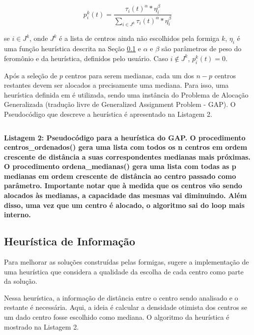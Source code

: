 \documentclass[12pt]{article}
\begin{document}
\begin{displaymath}
 p_i^k(t) = \frac{\tau_i(t)^\alpha * \eta_i ^ \beta}{\sum_{i \in J^k}^{} \tau_i(t)^\alpha * \eta_i^\beta}
\end{displaymath}

se $ i \in J^k $, onde $ J^k $ é a lista de centros ainda não escolhidos pela formiga $ k $, $ \eta_i $
é uma função heurística descrita na Seção \ref{sec:infheur} e $ \alpha $ e $ \beta $ são parâmetros de peso
do feromônio e da heurística, definidos pelo usuário. Caso $ i \notin J^k $, $ p_i^k(t) = 0 $.

Após a seleção de $ p $ centros para serem medianas, cada um dos $ n - p $ centros restantes devem ser alocados
a precisamente uma mediana. Para isso, uma heurística definida em \cite{dblp:fr}
é utilizada, sendo uma instância do Problema de Alocação Generalizada (tradução livre de Generalized Assignment
Problem - GAP). O Pseudocódigo que descreve a heurística é apresentado na Listagem 2.\\

\begin{mdframed}[linecolor=black, leftline=false, rightline=false]
    \inputminted[linenos, fontsize=\footnotesize]{text}{gap.txt}
\end{mdframed}

\begin{center}
 \textbf{Listagem 2: Pseudocódigo para a heurística do GAP. O procedimento centros\_ordenados() gera uma lista
 com todos os n centros em ordem crescente de distância a suas correspondentes medianas mais próximas. O procedimento
 ordena\_medianas() gera uma lista com todas as p medianas em ordem crescente de distância ao centro passado
 como parâmetro. Importante notar que à medida que os centros vão sendo alocados às medianas, a capacidade das mesmas
 vai diminuindo. Além disso, uma vez que um centro é alocado, o algoritmo sai do loop mais interno.}
\end{center}

\subsection{Heurística de Informação} \label{sec:infheur}

Para melhorar as soluções construídas pelas formigas, \cite{dblp:fr} sugere
a implementação de uma heurística que considera a qualidade da escolha de cada centro como parte da solução.

Nessa heurística, a informação de distância entre o centro sendo analisado e o restante é necessária. Aqui,
a ideia é calcular a densidade otimista dos centros se um dado centro fosse escolhido como mediana. O algoritmo
da heurística é mostrado na Listagem 2.\\
\end{document}
